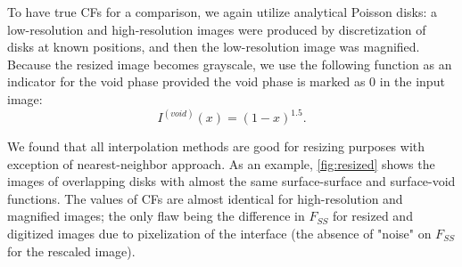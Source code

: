 \documentclass[reprint,amsmath,amssymb,aps,pre,showkeys,showpacs]{revtex4-1}
\begin{document}
To have true CFs for a comparison, we again utilize analytical Poisson disks: a
low-resolution and high-resolution images were produced by discretization of
disks at known positions, and then the low-resolution image was
magnified. Because the resized image becomes grayscale, we use the following
function as an indicator for the void phase provided the void phase is marked as
0 in the input image:
\begin{equation*}
  I^{(void)}(x) = (1 - x)^{1.5}.
\end{equation*}

We found that all interpolation methods are good for resizing purposes with
exception of nearest-neighbor approach. As an example, \cref{fig:resized} shows
the images of overlapping disks with almost the same surface-surface and
surface-void functions. The values of CFs are almost identical for
high-resolution and magnified images; the only flaw being the difference in
$F_{SS}$ for resized and digitized images due to pixelization of the interface
(the absence of "noise" on $F_{SS}$ for the rescaled image).
\end{document}
